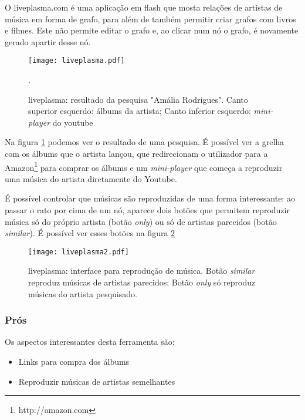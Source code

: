 O liveplasma.com é uma aplicação em flash que mosta relações de artistas de música em forma de grafo, para além de também permitir criar grafos com livros e filmes.
Este não permite editar o grafo e, ao clicar num nó o grafo, é novamente gerado apartir desse nó.

\begin{figure}[tb]
  \begin{center}
    \texttt{[image: liveplasma.pdf]}
  \end{center}
  \caption{liveplasma: resultado da pesquisa "Amália Rodrigues". Canto superior esquerdo: álbums da artista; Canto inferior esquerdo: \emph{mini-player} do youtube}.
  \label{fig:sota_liveplasma}
\end{figure}

Na figura \ref{fig:sota_liveplasma} podemos ver o resultado de uma pesquisa.
É possível ver a grelha com os álbums que o artista lançou, que redirecionam o utilizador para a Amazon\footnote{http://amazon.com} para comprar os álbums e um \emph{mini-player} que começa a reproduzir uma música do artista diretamente do Youtube.

É possível controlar que músicas são reproduzidas de uma forma interessante: ao passar o rato por cima de um nó, aparece dois botões que permitem reproduzir música só do próprio artista (botão \emph{only}) ou só de artistas parecidos (botão \emph{similar}).
É possível ver esses botões na figura \ref{fig:sota_liveplasma2}

\begin{figure}[tb]
  \begin{center}
    \texttt{[image: liveplasma2.pdf]}
  \end{center}
  \caption{liveplasma: interface para reprodução de música. Botão \emph{similar} reproduz músicas de artistas parecidos; Botão \emph{only} só reproduz músicas do artista pesquisado.}
  \label{fig:sota_liveplasma2}
\end{figure}

\subsubsection{Prós} %
\label{ssub:liveplasma_pros}

Os aspectos interessantes desta ferramenta são:

\begin{itemize}
  \item Links para compra dos álbums
  \item Reproduzir músicas de artistas semelhantes
\end{itemize}

